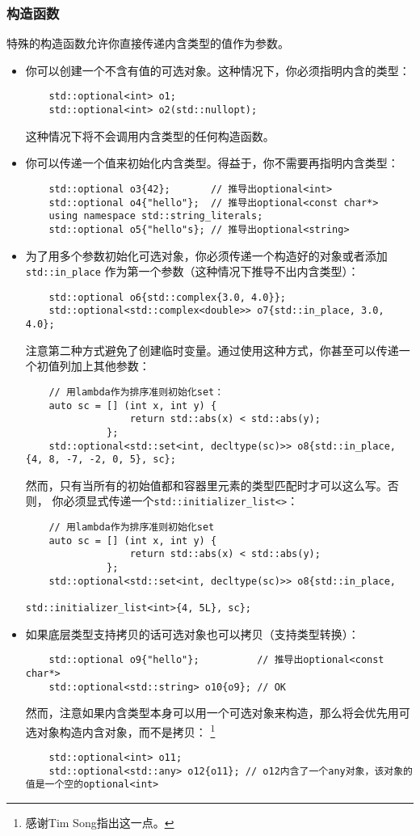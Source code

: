 \subsubsection{构造函数}
特殊的构造函数允许你直接传递内含类型的值作为参数。
\begin{itemize}
    \item 你可以创建一个不含有值的可选对象。这种情况下，你必须指明内含的类型：
    \begin{lstlisting}
    std::optional<int> o1;
    std::optional<int> o2(std::nullopt);
    \end{lstlisting}
    这种情况下将不会调用内含类型的任何构造函数。
    \item 你可以传递一个值来初始化内含类型。得益于，你不需要再指明内含类型：
    \begin{lstlisting}
    std::optional o3{42};       // 推导出optional<int>
    std::optional o4{"hello"};  // 推导出optional<const char*>
    using namespace std::string_literals;
    std::optional o5{"hello"s}; // 推导出optional<string>
    \end{lstlisting}
    \item 为了用多个参数初始化可选对象，你必须传递一个构造好的对象或者添加\texttt{std::in\_place}
    作为第一个参数（这种情况下推导不出内含类型）：
    \begin{lstlisting}
    std::optional o6{std::complex{3.0, 4.0}};
    std::optional<std::complex<double>> o7{std::in_place, 3.0, 4.0};
    \end{lstlisting}
    注意第二种方式避免了创建临时变量。通过使用这种方式，你甚至可以传递一个初值列加上其他参数：
    \begin{lstlisting}
    // 用lambda作为排序准则初始化set：
    auto sc = [] (int x, int y) {
                  return std::abs(x) < std::abs(y);
              };
    std::optional<std::set<int, decltype(sc)>> o8{std::in_place, {4, 8, -7, -2, 0, 5}, sc};
    \end{lstlisting}
    然而，只有当所有的初始值都和容器里元素的类型匹配时才可以这么写。否则，
    你必须显式传递一个\texttt{std::initializer\_list<>}：
    \begin{lstlisting}
    // 用lambda作为排序准则初始化set
    auto sc = [] (int x, int y) {
                  return std::abs(x) < std::abs(y);
              };
    std::optional<std::set<int, decltype(sc)>> o8{std::in_place,
                                                  std::initializer_list<int>{4, 5L}, sc};
    \end{lstlisting}
    \item 如果底层类型支持拷贝的话可选对象也可以拷贝（支持类型转换）：
    \begin{lstlisting}
    std::optional o9{"hello"};          // 推导出optional<const char*>
    std::optional<std::string> o10{o9}; // OK
    \end{lstlisting}
    然而，注意如果内含类型本身可以用一个可选对象来构造，那么将会优先用可选对象构造内含对象，而不是拷贝：
    \footnote{感谢Tim Song指出这一点。}
    \begin{lstlisting}
    std::optional<int> o11;
    std::optional<std::any> o12{o11}; // o12内含了一个any对象，该对象的值是一个空的optional<int>
    \end{lstlisting}
\end{itemize}
